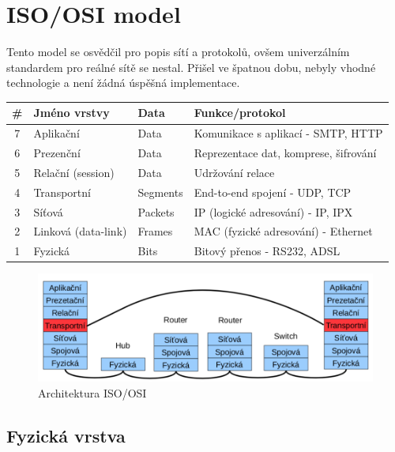 \documentclass{szzclass}
\begin{document}
\tableofcontents
\newpage



\hypertarget{isoosi-model}{%
\section{ISO/OSI model}\label{isoosi-model}}

Tento model se osvědčil pro popis sítí a protokolů, ovšem univerzálním
standardem pro reálné sítě se nestal. Přišel ve špatnou dobu, nebyly
vhodné technologie a není žádná úspěšná implementace.

\begin{longtable}[]{@{}clll@{}}
\toprule
\# & Jméno vrstvy & Data & Funkce/protokol\tabularnewline
\midrule
\endhead
7 & Aplikační & Data & Komunikace s aplikací - SMTP, HTTP\tabularnewline
6 & Prezenční & Data & Reprezentace dat, komprese,
šifrování\tabularnewline
5 & Relační (session) & Data & Udržování relace\tabularnewline
4 & Transportní & Segments & End-to-end spojení - UDP,
TCP\tabularnewline
3 & Síťová & Packets & IP (logické adresování) - IP, IPX\tabularnewline
2 & Linková (data-link) & Frames & MAC (fyzické adresování) -
Ethernet\tabularnewline
1 & Fyzická & Bits & Bitový přenos - RS232, ADSL\tabularnewline
\bottomrule
\end{longtable}

\begin{figure}[h]
\centering
\includegraphics[width=\textwidth]{topics/bi-spol-23/images/ISO-OSI-Architektura.png}
\caption{Architektura ISO/OSI}
\end{figure}

\hypertarget{fyzickuxe1-vrstva}{%
\subsection{Fyzická vrstva}\label{fyzickuxe1-vrstva}}
\end{document}
